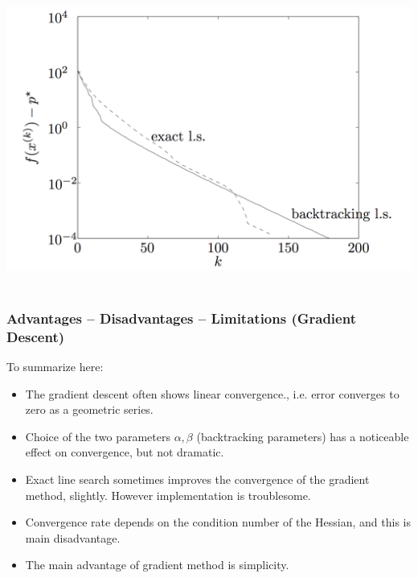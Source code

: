 \begin{frame}
{\begin{columns}
\begin{column}{0.5\textwidth}
\includegraphics[scale = 0.15]{pics/error.png}
  \end{column}
\end{columns}

}


\end{frame}

\subsection{}
\begin{frame}
  \frametitle{Advantages -- Disadvantages -- Limitations (Gradient
    Descent)}
To summarize here:
  \begin{itemize}
  \item The gradient descent often shows linear convergence.,
i.e. error converges to zero as a geometric series.
\item Choice of the two parameters $\alpha, \beta$ (backtracking parameters) has
  a noticeable effect on convergence, but not dramatic.
\item Exact line search sometimes improves the convergence of the
  gradient method, slightly. However implementation is troublesome.
\item Convergence rate depends on the condition number of the Hessian,
  and this is main disadvantage.
\item The main advantage of gradient method is simplicity.
  \end{itemize}

\end{frame}



